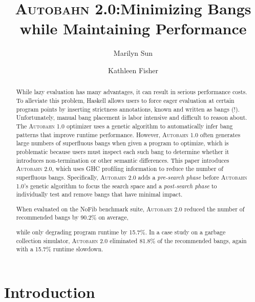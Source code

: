 \documentclass[format=sigplan, review=true]{acmart}
\newcommand{\SHOWCOMMENT}[1]{\ifdraft #1 \fi}
\newcommand{\ksf}[1]{\SHOWCOMMENT{{\color{tuftsblue} [K: #1]}}}
\newcommand{\cut}[1]{}
\newcommand{\acut}[1]{}
\newcommand{\Ao}[0]{\textsc{Autobahn 1.0}}
\newcommand{\At}[0]{\textsc{Autobahn 2.0}}
\newcommand{\preopt}[0]{pre-search}
\newcommand{\postopt}[0]{post-search}
\begin{document}
\title{\At:\break Minimizing Bangs while Maintaining Performance}
\author{Marilyn Sun}
\author{Kathleen Fisher}
\begin{abstract}

While lazy evaluation has many advantages, it can result in serious
performance costs. To alleviate this problem, Haskell allows users to
force eager evaluation at certain program points by inserting
strictness annotations, known and written as bangs (!).
Unfortunately, manual bang placement
is labor intensive and difficult to reason about. The \Ao{}
optimizer uses a genetic algorithm to automatically infer bang patterns
that improve runtime performance. However, \Ao{} often generates
large numbers of superfluous bangs when given a program to optimize,
which is problematic because users must inspect each such bang to
determine whether it introduces non-termination or other semantic
differences. 
This paper introduces \At, which uses GHC
profiling information to reduce the number of superfluous bangs.
Specifically,
\At{} adds a \textit{\preopt{} phase} before \Ao's genetic algorithm
to focus the search space and a \textit{\postopt{} phase} to individually test
and remove bangs that have minimal impact. 
\cut{When evaluated on the NoFib
benchmark, the \preopt{} phase on average eliminated 45~locations for
potential bang placement per 100~LOC and reduced the number of bangs
eventually generated by 12.21\%. Overall, }
When evaluated on the NoFib benchmark suite, 
\At{} reduced the number of recommended bangs by 90.2\% on average,
\cut{\At{} reduces the number of
bangs generated from 11~bangs/100~LOC to 1 bang/100~LOC, }
while only degrading program runtime by 15.7\%. 
In a case study on a garbage collection simulator, 
\At{} eliminated 81.8\% of the recommended bangs, again with a
15.7\% runtime slowdown.
\acut{
 Finally, it eliminated 91.3\% bangs with almost no runtime slowdown on
the \texttt{Aeson} parser library.}
\ksf{Say something about releasing the code.}
\end{abstract}


\maketitle

\section{Introduction}
\end{document}
